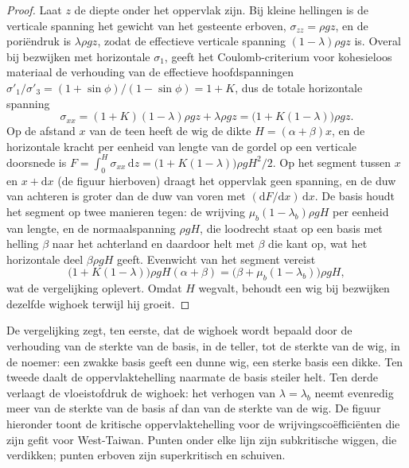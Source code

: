 \begin{proof}
Laat $z$ de diepte onder het oppervlak zijn. Bij kleine hellingen is de verticale
spanning het gewicht van het gesteente erboven, $\sigma_{zz} = \rho g z$, en de poriëndruk
is $\lambda\rho g z$, zodat de effectieve verticale spanning
$(1 - \lambda)\rho g z$ is. Overal bij bezwijken met horizontale $\sigma_1$,
geeft het Coulomb-criterium voor kohesieloos materiaal de verhouding van de
effectieve hoofdspanningen $\sigma'_1/\sigma'_3 = (1 + \sin\phi)/(1 -
\sin\phi) = 1 + K$, dus de totale horizontale spanning
\[
  \sigma_{xx} = (1 + K)(1 - \lambda)\rho g z + \lambda\rho g z
  = \bigl(1 + K(1 - \lambda)\bigr)\rho g z .
\]
Op de afstand $x$ van de teen heeft de wig de dikte $H = (\alpha +
\beta)x$, en de horizontale kracht per eenheid van lengte van de gordel op een verticale
doorsnede is $F = \int_0^H \sigma_{xx}\,\mathrm dz = \bigl(1 + K(1 -
\lambda)\bigr)\rho g H^2/2$. Op het segment tussen $x$ en $x + \mathrm dx$
(de figuur hierboven) draagt het oppervlak geen spanning, en de duw van achteren
is groter dan de duw van voren met $(\mathrm dF/\mathrm dx)\,\mathrm dx$.
De basis houdt het segment op twee manieren tegen: de wrijving $\mu_b(1 -
\lambda_b)\rho g H$ per eenheid van lengte, en de normaalspanning $\rho g H$, die
loodrecht staat op een basis met helling $\beta$ naar het achterland en daardoor
helt met $\beta$ die kant op, wat het horizontale deel $\beta\rho g H$ geeft.
Evenwicht van het segment vereist
\[
  \bigl(1 + K(1 - \lambda)\bigr)\rho g H(\alpha + \beta)
  = \bigl(\beta + \mu_b(1 - \lambda_b)\bigr)\rho g H ,
\]
wat de vergelijking oplevert. Omdat $H$ wegvalt, behoudt een wig bij bezwijken
dezelfde wighoek terwijl hij groeit.
\end{proof}

De vergelijking zegt, ten eerste, dat de wighoek wordt bepaald door de verhouding van de sterkte
van de basis, in de teller, tot de sterkte van de wig, in de
noemer: een zwakke basis geeft een dunne wig, een sterke basis een dikke.
Ten tweede daalt de oppervlaktehelling naarmate de basis steiler helt. Ten derde
verlaagt de vloeistofdruk de wighoek: het verhogen van $\lambda = \lambda_b$ neemt
evenredig meer van de sterkte van de basis af dan van de sterkte van de
wig. De figuur hieronder toont de kritische oppervlaktehelling voor de
wrijvingscoëfficiënten die zijn gefit voor West-Taiwan. Punten onder elke lijn zijn subkritische
wiggen, die verdikken; punten erboven zijn superkritisch en schuiven.

